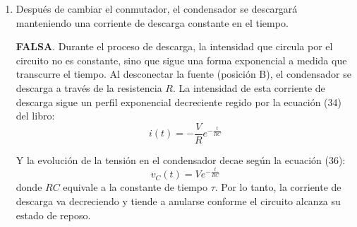 \documentclass[11pt, a4paper]{article}
\newenvironment{problem}[1][Cuestión]{
		\vspace{0.5cm}
		\noindent{\Large\bfseries #1} \par\vspace{0.5cm}
}{
		\vspace{0.5cm}
}
\begin{document}
\begin{problem}[Cuestión 5]
\begin{enumerate}[label=\alph*)]
			\vspace{0.5cm}

			\item Después de cambiar el conmutador, el condensador se descargará manteniendo una corriente de descarga constante en el tiempo.

				{ \color{blue} 
					\textbf{FALSA}. Durante el proceso de descarga, la intensidad que circula por el circuito no es constante, sino que sigue una forma exponencial a medida que transcurre el tiempo. Al desconectar la fuente (posición B), el condensador se descarga a través de la resistencia $R$. La intensidad de esta corriente de descarga sigue un perfil exponencial decreciente regido por la ecuación (34) del libro: 
					$$i(t) = -\frac{V}{R} e^{-\frac{t}{RC}}$$ 

					Y la evolución de la tensión en el condensador decae según la ecuación (36):
					$$v_C(t) = V e^{-\frac{t}{RC}}$$
					donde $RC$ equivale a la constante de tiempo $\tau$. Por lo tanto, la corriente de descarga va decreciendo y tiende a anularse conforme el circuito alcanza su estado de reposo.
				}
		\end{enumerate}
	\end{problem}
\end{document}

